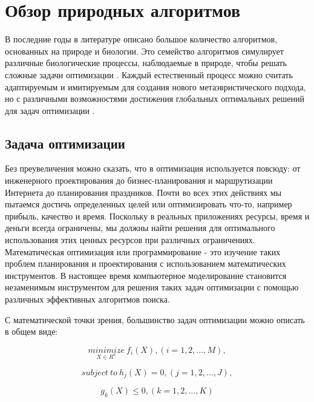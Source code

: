 \section{Обзор природных алгоритмов}\label{Section:Bio}

В последние годы в литературе описано большое количество алгоритмов, 
основанных на природе и биологии. Это семейство алгоритмов симулирует 
различные биологические процессы, наблюдаемые в природе, чтобы решать 
сложные задачи оптимизации \cite{Yang2009}. Каждый естественный процесс 
можно считать адаптируемым и имитируемым для создания нового 
метаэвристического подхода, но с различными возможностями достижения 
глобальных оптимальных решений для задач оптимизации \cite{BioInspiredTaxonomy}.

\subsection{Задача оптимизации}

Без преувеличения можно сказать, что в оптимизация используется повсюду: от 
инженерного проектирования до бизнес-планирования и маршрутизации 
Интернета до планирования праздников. Почти во всех этих действиях мы 
пытаемся достичь определенных целей или оптимизировать что-то, например 
прибыль, качество и время. Поскольку в реальных приложениях ресурсы, 
время и деньги всегда ограничены, мы должны найти решения для оптимального 
использования этих ценных ресурсов при различных ограничениях. 
Математическая оптимизация или программирование - это изучение таких 
проблем планирования и проектирования с использованием математических 
инструментов. В настоящее время компьютерное моделирование становится 
незаменимым инструментом для решения таких задач оптимизации с помощью 
различных эффективных алгоритмов поиска.

С математической точки зрения, большинство задач оптимизации можно описать 
в общем виде:

\begin{equation}\label{eq7}
    \underset{X \in R^n}{minimize} \: f_i(X), (i=1,2,\dots,M),
\end{equation}

\begin{equation}\label{eq8}
    subject\: to \: h_j(X) = 0, (j=1,2,\dots,J),
\end{equation}

\begin{equation}\label{eq9}
    g_k(X) \leq 0, (k=1,2,\dots,K)
\end{equation}

